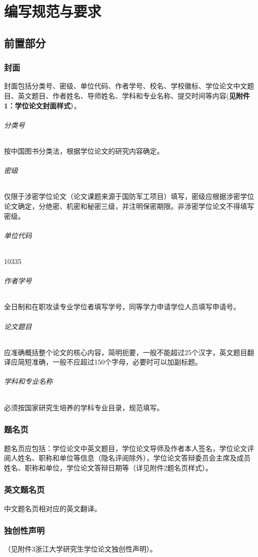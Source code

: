 \chapter{编写规范与要求}
\section{前置部分}
\subsection{封面}
封面包括分类号、密级、单位代码、作者学号、校名、学校徽标、学位论文中文题目、英文题目、作者姓名、导师姓名、学科和专业名称、提交时间等内容(\textbf{见附件1：学位论文封面样式}）。
\subparagraph{分类号} %
\label{par:分类号}
按中国图书分类法，根据学位论文的研究内容确定。
\subparagraph{密级} %
\label{par:密级}
仅限于涉密学位论文（论文课题来源于国防军工项目）填写，密级应根据涉密学位论文确定，分绝密、机密和秘密三级，并注明保密期限。非涉密学位论文不得填写密级。
\subparagraph{单位代码} %
\label{par:单位代码}
10335
\subparagraph{作者学号} %
\label{par:作者学号}
全日制和在职攻读专业学位者填写学号，同等学力申请学位人员填写申请号。
\subparagraph{论文题目} %
\label{par:论文题目}
应准确概括整个论文的核心内容，简明扼要，一般不能超过25个汉字，英文题目翻译应简短准确，一般不应超过150个字母，必要时可以加副标题。
\subparagraph{学科和专业名称} %
\label{par:学科和专业名称}
必须按国家研究生培养的学科专业目录，规范填写。
\subsection{题名页} %
\label{sub:题名页}
题名页应包括：学位论文中英文题目，学位论文导师及作者本人签名，学位论文评阅人姓名、职称和单位等信息（隐名评阅除外），学位论文答辩委员会主席及成员姓名、职称和单位，学位论文答辩日期等（详见附件2题名页样式）。
\subsection{英文题名页} %
\label{sub:英文题名页}
中文题名页相对应的英文翻译。
\subsection{独创性声明} %
\label{sub:独创性声明}
（见附件3浙江大学研究生学位论文独创性声明）。
